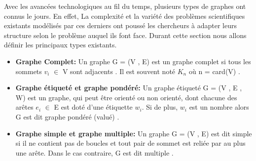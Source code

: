 	Avec les avancées technologiques au fil du temps, plusieurs types de graphes ont connus le jours. En effet, La complexité et la variété des problèmes scientifiques existants modélisés par ces derniers ont poussé les chercheurs à adapter leurs structure selon le problème auquel ils font face. Durant cette section nous allons définir les principaux types existants.
	
		\begin{itemize}[label=$\circ$]
		
			\item \textbf{Graphe Complet:} Un graphe G = (V , E) est un graphe complet si tous les sommets $v_{i}$ $\in$ V sont adjacents \citep{Pres}. Il est souvent noté $K_{n}$ où n = card(V) \citep{DUT}.
				
			
			\item \textbf{Graphe étiqueté et graphe pondéré:}
			 Un graphe étiqueté G = (V , E , W) est un graphe, qui peut être orienté ou non orienté, dont chacune des arêtes $e_{i}$ $\in$ E est doté d'une étiquette $w_{i}$. Si de plus, $w_{i}$ est un nombre alors G est dit graphe pondéré (valué) \citep{DUT}.
		
			\item \textbf{Graphe simple et graphe multiple:}
			Un graphe G = (V , E) est dit simple si il ne contient pas de boucles et tout pair de sommet est reliée par au plus une arête. Dans le cas contraire, G est dit multiple \citep{IUTLyonInformatique}.
			
		
		\end{itemize}
		